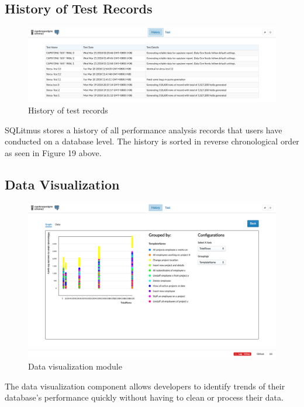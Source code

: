 \documentclass[12pt]{report}
\begin{document}
\begin{spacing}{1.9}
	\subsection{History of Test Records}
	
	\begin{figure}[H]
		\centering
		\includegraphics[width=\textwidth]{3-6-1.png}
		\caption{History of test records}
		
	\end{figure}
	
	SQLitmus stores a history of all performance analysis records that users have conducted on a database level. The history is sorted in reverse chronological order as seen in Figure 19 above.
	
	\subsection{Data Visualization}
	
	\begin{figure}[H]
		\centering
		\includegraphics[width=\textwidth]{3-6-2.png}
		\caption{Data visualization module}
		
	\end{figure}
	
	The data visualization component allows developers to identify trends of their database's performance quickly without having to clean or process their data.
	

\end{spacing}
\end{document}

